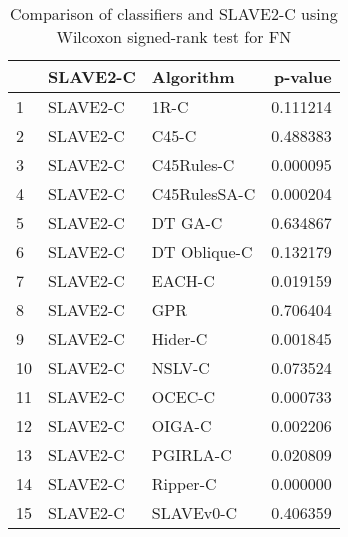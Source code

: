 \begin{table}
\footnotesize
\caption{Comparison of classifiers and SLAVE2-C using Wilcoxon signed-rank test for FN}
\label{tab:SLAVE2-C wilcoxon FN comparison}
\begin{tabular}{lllr}
\hline
 & SLAVE2-C & Algorithm & p-value \\
\hline
1 & SLAVE2-C & 1R-C & 0.111214 \\
2 & SLAVE2-C & C45-C & 0.488383 \\
3 & SLAVE2-C & C45Rules-C & 0.000095 \\
4 & SLAVE2-C & C45RulesSA-C & 0.000204 \\
5 & SLAVE2-C & DT GA-C & 0.634867 \\
6 & SLAVE2-C & DT Oblique-C & 0.132179 \\
7 & SLAVE2-C & EACH-C & 0.019159 \\
8 & SLAVE2-C & GPR & 0.706404 \\
9 & SLAVE2-C & Hider-C & 0.001845 \\
10 & SLAVE2-C & NSLV-C & 0.073524 \\
11 & SLAVE2-C & OCEC-C & 0.000733 \\
12 & SLAVE2-C & OIGA-C & 0.002206 \\
13 & SLAVE2-C & PGIRLA-C & 0.020809 \\
14 & SLAVE2-C & Ripper-C & 0.000000 \\
15 & SLAVE2-C & SLAVEv0-C & 0.406359 \\
\hline
\end{tabular}
\end{table}
